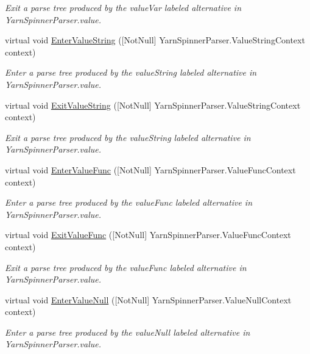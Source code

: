 \begin{DoxyCompactItemize}
\begin{DoxyCompactList}\small\item\em Exit a parse tree produced by the {\ttfamily value\-Var} labeled alternative in Yarn\-Spinner\-Parser.\-value. \end{DoxyCompactList}\item 
virtual void \hyperlink{a00190_a86517c7ed031c5b2608ff7acf8b36ab1}{Enter\-Value\-String} (\mbox{[}Not\-Null\mbox{]} Yarn\-Spinner\-Parser.\-Value\-String\-Context context)
\begin{DoxyCompactList}\small\item\em Enter a parse tree produced by the {\ttfamily value\-String} labeled alternative in Yarn\-Spinner\-Parser.\-value. \end{DoxyCompactList}\item 
virtual void \hyperlink{a00190_a0edac722aaa4daaf67b6952f9f323849}{Exit\-Value\-String} (\mbox{[}Not\-Null\mbox{]} Yarn\-Spinner\-Parser.\-Value\-String\-Context context)
\begin{DoxyCompactList}\small\item\em Exit a parse tree produced by the {\ttfamily value\-String} labeled alternative in Yarn\-Spinner\-Parser.\-value. \end{DoxyCompactList}\item 
virtual void \hyperlink{a00190_af8f0ba926e47307649e74f867ac60a46}{Enter\-Value\-Func} (\mbox{[}Not\-Null\mbox{]} Yarn\-Spinner\-Parser.\-Value\-Func\-Context context)
\begin{DoxyCompactList}\small\item\em Enter a parse tree produced by the {\ttfamily value\-Func} labeled alternative in Yarn\-Spinner\-Parser.\-value. \end{DoxyCompactList}\item 
virtual void \hyperlink{a00190_ac9b0090b8a75d8aa28bcca61fedb5906}{Exit\-Value\-Func} (\mbox{[}Not\-Null\mbox{]} Yarn\-Spinner\-Parser.\-Value\-Func\-Context context)
\begin{DoxyCompactList}\small\item\em Exit a parse tree produced by the {\ttfamily value\-Func} labeled alternative in Yarn\-Spinner\-Parser.\-value. \end{DoxyCompactList}\item 
virtual void \hyperlink{a00190_aea9d4639edf6d5d016b70057ac8c4759}{Enter\-Value\-Null} (\mbox{[}Not\-Null\mbox{]} Yarn\-Spinner\-Parser.\-Value\-Null\-Context context)
\begin{DoxyCompactList}\small\item\em Enter a parse tree produced by the {\ttfamily value\-Null} labeled alternative in Yarn\-Spinner\-Parser.\-value. \end{DoxyCompactList}\item 

\end{DoxyCompactItemize}
